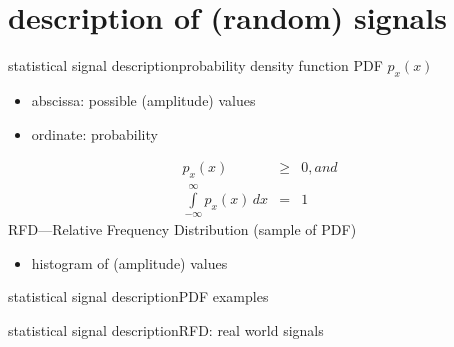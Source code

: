     \section[signal description]{description of (random) signals}
            \begin{frame}{statistical signal description}{probability density function}
                PDF $p_x(x)$
                \begin{itemize}
                    \item	abscissa: possible (amplitude) values
                    \item	ordinate: probability
                \end{itemize}
                \pause
                \begin{eqnarray*}
                    p_x(x)&\geq& 0 , and\\	
                    \int\limits_{-\infty}^{\infty}{p_x(x)\, dx} &=& 1	
                \end{eqnarray*}
                \pause
                RFD---Relative Frequency Distribution (sample of PDF)
                \begin{itemize}
                    \item[] histogram of (amplitude) values
                \end{itemize}
            \end{frame}	
            
            \begin{frame}{statistical signal description}{PDF examples}
            \end{frame}
                
            \begin{frame}{statistical signal description}{RFD: real world signals}
            \end{frame}	

